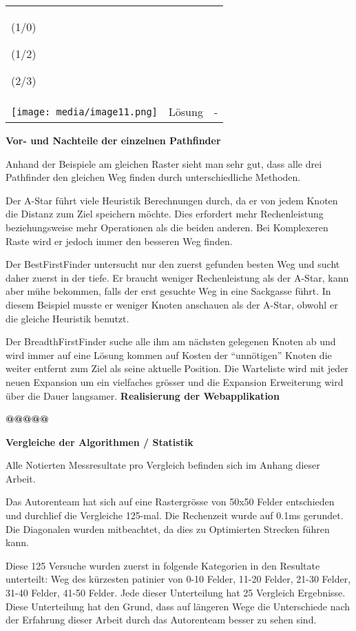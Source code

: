 \begin{longtable}[]{@{}lll@{}}
\begin{minipage}[t]{0.30\columnwidth}
(1/0)

(1/2)

(2/3)\strut
\end{minipage}\tabularnewline
\texttt{[image: media/image11.png]} &
Lösung & -\tabularnewline
\bottomrule
\end{longtable}

\textbf{Vor- und Nachteile der einzelnen Pathfinder}

Anhand der Beispiele am gleichen Raster sieht man sehr gut, dass alle
drei Pathfinder den gleichen Weg finden durch unterschiedliche Methoden.

Der A-Star führt viele Heuristik Berechnungen durch, da er von jedem
Knoten die Distanz zum Ziel speichern möchte. Dies erfordert mehr
Rechenleistung beziehungsweise mehr Operationen als die beiden anderen.
Bei Komplexeren Raste wird er jedoch immer den besseren Weg finden.

Der BestFirstFinder untersucht nur den zuerst gefunden besten Weg und
sucht daher zuerst in der tiefe. Er braucht weniger Rechenleistung als
der A-Star, kann aber mühe bekommen, falls der erst gesuchte Weg in eine
Sackgasse führt. In diesem Beispiel musste er weniger Knoten anschauen
als der A-Star, obwohl er die gleiche Heuristik benutzt.

Der BreadthFirstFinder suche alle ihm am nächsten gelegenen Knoten ab
und wird immer auf eine Lösung kommen auf Kosten der ``unnötigen''
Knoten die weiter entfernt zum Ziel als seine aktuelle Position. Die
Warteliste wird mit jeder neuen Expansion um ein vielfaches grösser und
die Expansion Erweiterung wird über die Dauer langsamer.
\textbf{Realisierung der Webapplikation}

\textbf{@@@@@}

\textbf{Vergleiche der Algorithmen / Statistik }

Alle Notierten Messresultate pro Vergleich befinden sich im Anhang
dieser Arbeit.

Das Autorenteam hat sich auf eine Rastergrösse von 50x50 Felder
entschieden und durchlief die Vergleiche 125-mal. Die Rechenzeit wurde
auf 0.1ms gerundet. Die Diagonalen wurden mitbeachtet, da dies zu
Optimierten Strecken führen kann.

Diese 125 Versuche wurden zuerst in folgende Kategorien in den Resultate
unterteilt: Weg des kürzesten patinier von 0-10 Felder, 11-20 Felder,
21-30 Felder, 31-40 Felder, 41-50 Felder. Jede dieser Unterteilung hat
25 Vergleich Ergebnisse. Diese Unterteilung hat den Grund, dass auf
längeren Wege die Unterschiede nach der Erfahrung dieser Arbeit durch
das Autorenteam besser zu sehen sind.

